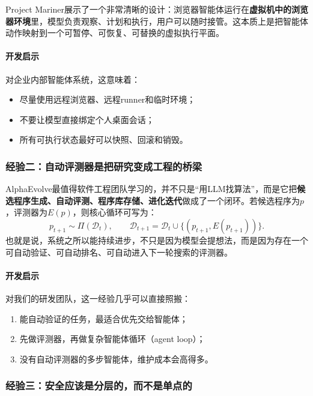 \documentclass[12pt,a4paper]{article}
\begin{document}
Project Mariner展示了一个非常清晰的设计：浏览器智能体运行在\textbf{虚拟机中的浏览器环境}里，模型负责观察、计划和执行，用户可以随时接管。这本质上是把智能体动作映射到一个可暂停、可恢复、可替换的虚拟执行平面。

\paragraph{开发启示}

对企业内部智能体系统，这意味着：
\begin{itemize}
    \item 尽量使用远程浏览器、远程runner和临时环境；
    \item 不要让模型直接绑定个人桌面会话；
    \item 所有可执行状态最好可以快照、回滚和销毁。
\end{itemize}

\subsubsection{经验二：自动评测器是把研究变成工程的桥梁}

AlphaEvolve最值得软件工程团队学习的，并不只是“用LLM找算法”，而是它把\textbf{候选程序生成、自动评测、程序库存储、进化迭代}做成了一个闭环。若候选程序为$p$，评测器为$E(p)$，则核心循环可写为：
\begin{equation}
p_{t+1} \sim \Pi(\mathcal{D}_t), \qquad
\mathcal{D}_{t+1} = \mathcal{D}_t \cup \{(p_{t+1}, E(p_{t+1}))\}.
\end{equation}
也就是说，系统之所以能持续进步，不只是因为模型会提想法，而是因为存在一个可自动验证、可自动排名、可自动进入下一轮搜索的评测器。
\paragraph{开发启示}

对我们的研发团队，这一经验几乎可以直接照搬：
\begin{enumerate}
    \item 能自动验证的任务，最适合优先交给智能体；
    \item 先做评测器，再做复杂智能体循环（agent loop）；
    \item 没有自动评测器的多步智能体，维护成本会高得多。
\end{enumerate}

\subsubsection{经验三：安全应该是分层的，而不是单点的}
\end{document}
